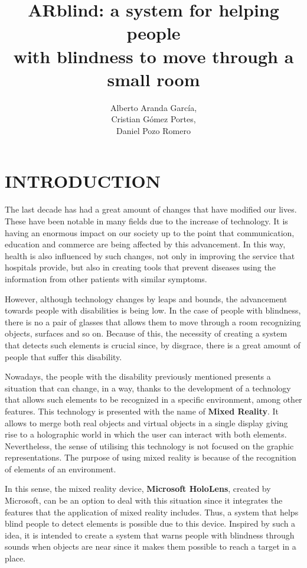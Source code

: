 \documentclass{pre-tfg}
\title{ARblind: a system for helping people \\ with blindness to move through a small room}
\author{Alberto Aranda García,\\ \tab[1.6cm] Cristian Gómez Portes, \\ \tab[1.6cm] Daniel Pozo Romero}
\begin{document}
\maketitle
\tableofcontents

\newpage

\section{INTRODUCTION}

The last decade has had a great amount of changes that have modified our lives. These have been notable in many 
fields due to the increase of technology. It is having an enormous impact on our society up to the point that communication, 
education and commerce are being affected by this advancement. In this way, health is also influenced by such changes, 
not only in improving the service that hospitals provide, but also in creating tools that prevent diseases using the information 
from other patients with similar symptoms. 

However, although technology changes by leaps and bounds, the advancement towards people with disabilities is being low. 
In the case of people with blindness, there is no a pair of glasses that allows them to move through a room recognizing objects, 
surfaces and so on. Because of this, the necessity of creating a system that detects such elements is crucial since, by disgrace, 
there is a great amount of people that suffer this disability.

Nowadays, the people with the disability previously mentioned presents a situation that can change, in a way, thanks to the development 
of a technology that allows such elements to be recognized in a specific environment, among other features. This technology is presented
with the name of \textbf{Mixed Reality}. 
It allows to merge both real objects and virtual objects in a single display giving rise to a holographic world in which the user can 
interact with both elements. Nevertheless, the sense of utilising this technology is not focused on the graphic representations. 
The purpose of using mixed reality is because of the recognition of elements of an environment.

In this sense, the mixed reality device, \textbf{Microsoft HoloLens}, created by Microsoft, can be an option to deal with this situation
since it integrates the features that the application of mixed reality includes. Thus, a system that helps blind people to detect elements
is possible due to this device. Inspired by such a idea, it is intended to create a system that warns people with blindness through sounds
when objects are near since it makes them possible to reach a target in a place.
\end{document}
